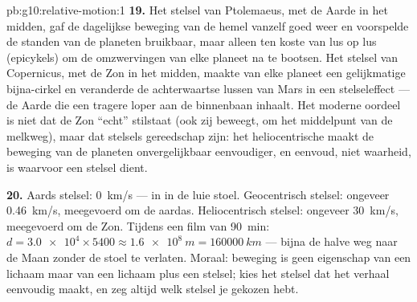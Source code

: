 \begin{solution}{pb:g10:relative-motion:1}
\textbf{19.} Het stelsel van Ptolemaeus, met de Aarde in het midden,
gaf de dagelijkse beweging van de hemel vanzelf goed weer en voorspelde
de standen van de planeten bruikbaar, maar alleen ten koste van lus op
lus (epicykels) om de omzwervingen van elke planeet na te bootsen. Het
stelsel van Copernicus, met de Zon in het midden, maakte van elke planeet
een gelijkmatige bijna-cirkel en veranderde de achterwaartse lussen van
Mars in een stelseleffect --- de Aarde die een tragere loper aan de
binnenbaan inhaalt. Het moderne oordeel is niet dat de Zon ``echt''
stilstaat (ook zij beweegt, om het middelpunt van de melkweg), maar dat
stelsels gereedschap zijn: het heliocentrische maakt de beweging van de
planeten onvergelijkbaar eenvoudiger, en eenvoud, niet waarheid, is
waarvoor een stelsel dient.

\textbf{20.} Aards stelsel: \qty{0}{km/s} --- in  in de luie stoel.
Geocentrisch stelsel: ongeveer \qty{0.46}{km/s}, meegevoerd om de
aardas. Heliocentrisch stelsel: ongeveer \qty{30}{km/s}, meegevoerd om
de Zon. Tijdens een film van \qty{90}{min}:
$d = \num{3.0e4} \times 5400 \approx \qty{1.6e8}{m} = \qty{160000}{km}$
--- bijna de halve weg naar de Maan zonder de stoel te verlaten. Moraal:
beweging is geen eigenschap van een lichaam maar van een lichaam plus een
stelsel; kies het stelsel dat het verhaal eenvoudig maakt, en zeg altijd
welk stelsel je gekozen hebt.
\end{solution}
